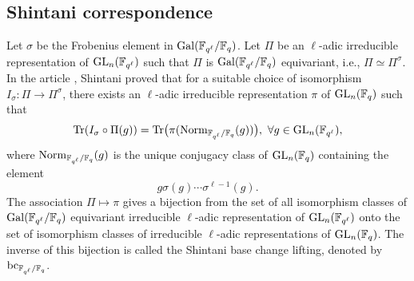\documentclass[10pt, reqno]{amsart}
\theoremstyle{plain}
\numberwithin{equation}{section} \newcommand{\di}{\operatorname{dim}}
\begin{document}
\subsection{Shintani correspondence}\label{BC_finite_groups}
Let $\sigma$ be the Frobenius element in
${\rm Gal}(\mathbb{F}_{q^\ell}/\mathbb{F}_q)$.  Let $\Pi$ be an $\ell$-adic irreducible
representation of ${\rm GL}_n(\mathbb{F}_{q^\ell})$ such that $\Pi$ is
${\rm Gal}(\mathbb{F}_{q^\ell}/\mathbb{F}_q)$
equivariant, i.e., $\Pi\simeq \Pi^\sigma$.  In the article \cite[Theorem
1]{Shintani_BC}, Shintani proved that for a suitable choice of
isomorphism $I_\sigma:\Pi\rightarrow \Pi^\sigma$, there exists an $\ell$-adic
irreducible representation $\pi$ of ${\rm GL}_n(\mathbb{F}_q)$ such that
\begin{equation}\label{BC_Char_formula}
{\rm Tr}(I_\sigma\circ \Pi(g)) = 
{\rm Tr}\big(\pi({\rm Norm}_{\mathbb{F}_{q^\ell}/\mathbb{F}_q}(g))\big),\ 
\forall g\in {\rm GL}_n(\mathbb{F}_{q^\ell}),
\end{equation}
where ${\rm Norm}_{\mathbb{F}_{q^\ell}/\mathbb{F}_q}(g)$ is the unique
conjugacy class of ${\rm GL}_n(\mathbb{F}_q)$ containing the element
$$g\sigma(g)\cdots\sigma^{\ell-1}(g).$$ The association $\Pi\mapsto \pi$
gives a bijection from the set of all isomorphism classes of
${\rm Gal}(\mathbb{F}_{q^\ell}/\mathbb{F}_q)$ equivariant irreducible $\ell$-adic
representation of ${\rm GL}_n(\mathbb{F}_{q^\ell})$ onto the set of
isomorphism classes of irreducible $\ell$-adic representations of
${\rm GL}_n(\mathbb{F}_q)$. The inverse of this bijection is called the
Shintani base change lifting, denoted by
${\rm bc}_{\mathbb{F}_{q^\ell}/\mathbb{F}_q}$.
\end{document}
